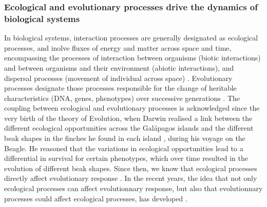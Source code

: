 \subsubsection*{Ecological and evolutionary processes drive the dynamics of biological systems}
% 
%
% 
In biological systems, interaction processes are generally designated as ecological processes, and inolve fluxes of energy and matter across space and time, encompassing the processes of interaction between organisms (biotic interactions) and between organisms and their environment (abiotic interactions), and dispersal processes (movement of individual across space) \cite{Vellend2010a}.
% 
Evolutionary processes designate those processes responsible for the change of heritable characteristics (DNA, genes, phenotypes) over successive generations \cite{Hall2013}.
% 
The coupling between ecological and evolutionary processes is acknowledged since the very birth of the theory of Evolution, when Darwin realised a link between the different ecological opportunities across the Galápagos islands and the different beak shapes in the finches he found in each island \cite{darwin2004origin}, during his voyage on the Beagle.
% 
He reasoned that the variations in ecological opportunities lead to a differential in survival for certain phenotypes, which over time resulted in the evolution of different beak shapes.
% 
Since then, we know that ecological processes directly affect evolutionary response \cite{Ezard2009}.
% 
In the recent years, the idea that not only ecological processes can affect evolutionnary response, but also that evolutionnary processes could affect ecological processes, has developed \cite{XXX}.
